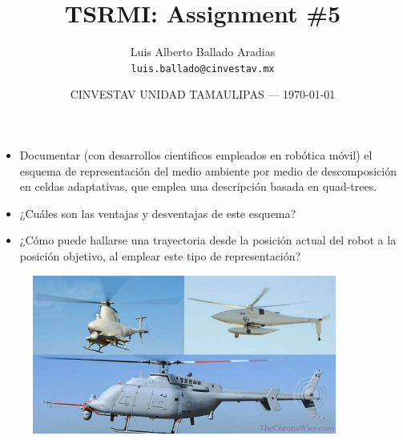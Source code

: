 \documentclass{article}
\title{TSRMI: Assignment \#5} %
\author{Luis Alberto Ballado Aradias\\ \texttt{luis.ballado@cinvestav.mx}} %
\date{CINVESTAV UNIDAD TAMAULIPAS --- \today} %
\begin{document}
\maketitle %


\begin{itemize} %
\item Documentar (con desarrollos cientificos empleados en robótica móvil) el esquema de representación del medio ambiente por medio de descomposición en celdas adaptativas, que emplea una descripción basada en quad-trees.
\item {¿Cuáles son las ventajas y desventajas de este esquema?}
\item {¿Cómo puede hallarse una trayectoria desde la posición actual del robot a la posición objetivo, al emplear este tipo de representación?}
\end{itemize}


\begin{figure}[h]
  \includegraphics[width=10cm]{images/single_rotor.jpg}
  \centering
\end{figure}
\end{document}

